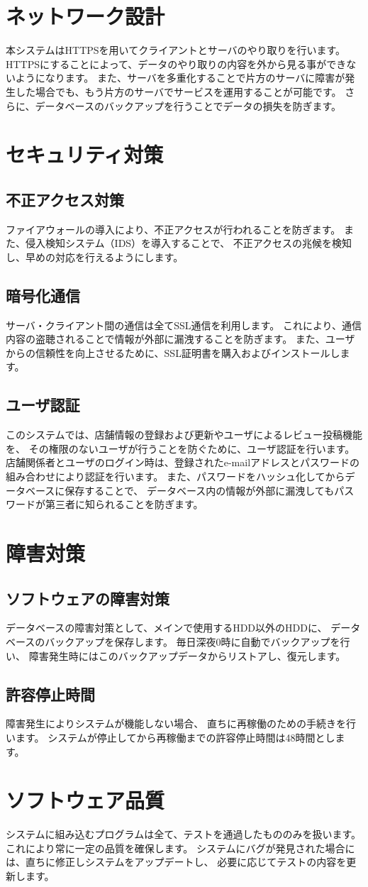 \documentclass[a4j,titlepage]{jarticle}
\begin{document}
\section{ネットワーク設計}
本システムはHTTPSを用いてクライアントとサーバのやり取りを行います。
HTTPSにすることによって、データのやり取りの内容を外から見る事ができないようになります。
また、サーバを多重化することで片方のサーバに障害が発生した場合でも、もう片方のサーバでサービスを運用することが可能です。
さらに、データベースのバックアップを行うことでデータの損失を防ぎます。

\section{セキュリティ対策}
\subsection{不正アクセス対策}
ファイアウォールの導入により、不正アクセスが行われることを防ぎます。
また、侵入検知システム（IDS）を導入することで、
不正アクセスの兆候を検知し、早めの対応を行えるようにします。
\subsection{暗号化通信}
サーバ・クライアント間の通信は全てSSL通信を利用します。
これにより、通信内容の盗聴されることで情報が外部に漏洩することを防ぎます。
また、ユーザからの信頼性を向上させるために、SSL証明書を購入およびインストールします。
\subsection{ユーザ認証}
このシステムでは、店舗情報の登録および更新やユーザによるレビュー投稿機能を、
その権限のないユーザが行うことを防ぐために、ユーザ認証を行います。
店舗関係者とユーザのログイン時は、登録されたe-mailアドレスとパスワードの組み合わせにより認証を行います。
また、パスワードをハッシュ化してからデータベースに保存することで、
データベース内の情報が外部に漏洩してもパスワードが第三者に知られることを防ぎます。

\section{障害対策}
\subsection{ソフトウェアの障害対策}
データベースの障害対策として、メインで使用するHDD以外のHDDに、
データベースのバックアップを保存します。
毎日深夜0時に自動でバックアップを行い、
障害発生時にはこのバックアップデータからリストアし、復元します。
\subsection{許容停止時間}
障害発生によりシステムが機能しない場合、
直ちに再稼働のための手続きを行います。
システムが停止してから再稼働までの許容停止時間は48時間とします。

\section{ソフトウェア品質}
システムに組み込むプログラムは全て、テストを通過したもののみを扱います。
これにより常に一定の品質を確保します。
システムにバグが発見された場合には、直ちに修正しシステムをアップデートし、
必要に応じてテストの内容を更新します。
\end{document}
